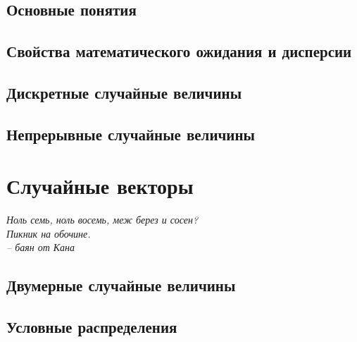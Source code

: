 \documentclass[12pt]{report}
\theoremstyle{plain}
\theoremstyle{definition}
\begin{document}
\section{Основные понятия}

\section{Свойства математического ожидания и дисперсии}

\section{Дискретные случайные величины}

\section{Непрерывные случайные величины}

\chapter{Случайные векторы}
\begin{flushright}
    \textit{
        Ноль семь, ноль восемь, меж берез и сосен? \\
        Пикник на обочине. \\
        -- баян от Кана
    }
\end{flushright}
\section{Двумерные случайные величины}

\section{Условные распределения}
\end{document}
